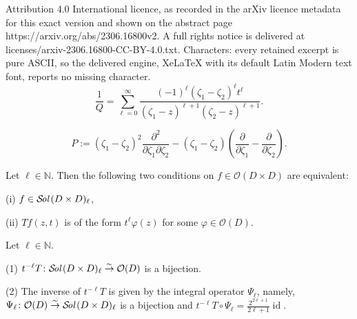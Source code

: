\documentclass[10pt,a4paper]{amsart}
\newcommand\Sol{{\mathcal {S}}\!{\text{\it{ol}}}\,}
\begin{document}
Attribution 4.0 International licence, as recorded in the arXiv licence metadata for this exact version and shown on the abstract page https://arxiv.org/abs/2306.16800v2. A full rights notice is delivered at licenses/arxiv-2306.16800-CC-BY-4.0.txt. Characters: every retained excerpt is pure ASCII, so the delivered engine, XeLaTeX with its default Latin Modern text font, reports no missing character.
\begin{equation}
\label{eqn:QTaylor}
  \frac 1 Q
  =
  \sum_{\ell=0}^\infty \frac{(-1)^{\ell}(\zeta_1-\zeta_2)^{\ell}t^{\ell}}{(\zeta_1-z)^{\ell+1}(\zeta_2-z)^{\ell+1}}.  
\end{equation}

\begin{equation}
\label{eqn:23031847}
P:=
(\zeta_1-\zeta_2)^2 
\frac{\partial^2}{\partial \zeta_1 \partial \zeta_2}
-
(\zeta_1-\zeta_2) 
(\frac{\partial}{\partial \zeta_1}-\frac{\partial}{\partial \zeta_2}).  
\end{equation}

\begin{corollary}
\label{cor:Luminy0316}
Let $\ell \in {\mathbb{N}}$.  
Then the following two conditions on $f \in {\mathcal{O}}(D \times D)$ are equivalent:
\par\noindent
{\rm{(i)}}\enspace
$f \in \Sol(D \times D)_{\ell}$, 
\par\noindent
{\rm{(ii)}}\enspace
$T f (z,t)$ is of the form $t^{\ell} \varphi (z)$
 for some $\varphi \in {\mathcal{O}}(D)$.    
\end{corollary}

\begin{theorem}
\label{thm:Tlsol}
Let $\ell \in {\mathbb{N}}$.  
\par\noindent
{\rm{(1)}}\enspace
$t^{-\ell}T \colon \Sol(D \times D)_{\ell} \overset \sim \rightarrow {\mathcal{O}}(D)$
 is a bijection.  
\par\noindent
{\rm{(2)}}\enspace
The inverse of $t^{-\ell}T$ is given 
 by the integral operator $\Psi_{\ell}$, 
 namely, 
$
   \Psi_{\ell} \colon {\mathcal{O}}(D)
   \overset \sim \rightarrow
   \Sol(D \times D)_{\ell}
$
 is a bijection
 and 
$
  t^{-\ell} T \circ \Psi_{\ell}
  = \frac{2^{2\ell+1}}{2 \ell+1} \operatorname{id}.
$
\end{theorem}
\end{document}
